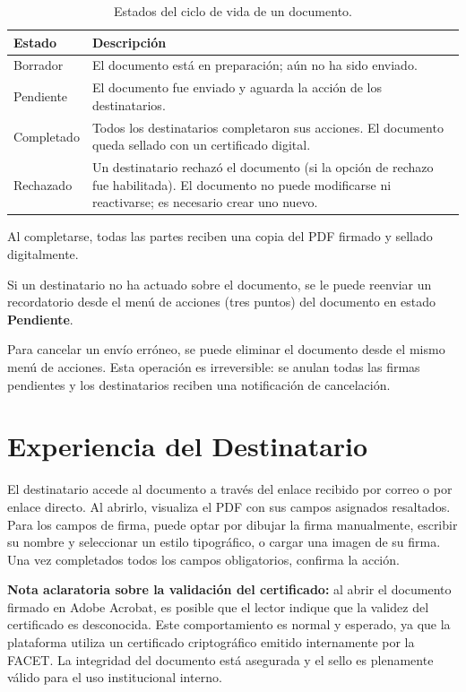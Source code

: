 \documentclass[
    11pt,
    spanish,
]{article}
\begin{document}
\begin{table}[H]
\centering
\caption{Estados del ciclo de vida de un documento.}
\label{tab:apD_estados}
\begin{tabular}{l p{10cm}}
\hline
\textbf{Estado} & \textbf{Descripción} \\
\hline
Borrador    & El documento está en preparación; aún no ha sido enviado. \\
Pendiente   & El documento fue enviado y aguarda la acción de los destinatarios. \\
Completado  & Todos los destinatarios completaron sus acciones. El documento queda sellado con un certificado digital. \\
Rechazado   & Un destinatario rechazó el documento (si la opción de rechazo fue habilitada). El documento no puede modificarse ni reactivarse; es necesario crear uno nuevo. \\
\hline
\end{tabular}
\end{table}

Al completarse, todas las partes reciben una copia del PDF firmado y sellado digitalmente.

Si un destinatario no ha actuado sobre el documento, se le puede reenviar un recordatorio desde el menú de acciones (tres puntos) del documento en estado \textbf{Pendiente}.

Para cancelar un envío erróneo, se puede eliminar el documento desde el mismo menú de acciones. Esta operación es irreversible: se anulan todas las firmas pendientes y los destinatarios reciben una notificación de cancelación.


\section{Experiencia del Destinatario}
\label{sec:Destinatario}

El destinatario accede al documento a través del enlace recibido por correo o por enlace directo. Al abrirlo, visualiza el PDF con sus campos asignados resaltados. Para los campos de firma, puede optar por dibujar la firma manualmente, escribir su nombre y seleccionar un estilo tipográfico, o cargar una imagen de su firma. Una vez completados todos los campos obligatorios, confirma la acción.

\medskip
\noindent\textbf{Nota aclaratoria sobre la validación del certificado:} al abrir el documento firmado en Adobe Acrobat, es posible que el lector indique que la validez del certificado es desconocida. Este comportamiento es normal y esperado, ya que la plataforma utiliza un certificado criptográfico emitido internamente por la FACET. La integridad del documento está asegurada y el sello es plenamente válido para el uso institucional interno.
\end{document}
